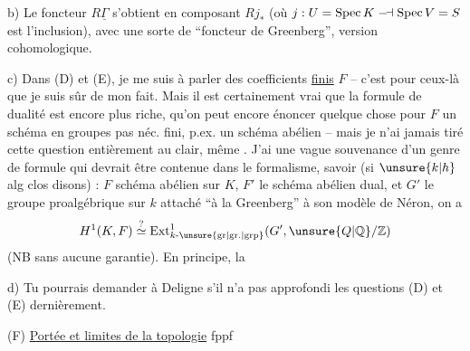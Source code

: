 b) Le foncteur $R\underline{\Gamma}$ s'obtient en composant $Rj_*$ (où $j:U=\operatorname{Spec}K\mathrel{\relbar\joinrel\dashv}\operatorname{Spec}V=S$ est l'inclusion), avec une sorte de ``foncteur de Greenberg'', version cohomologique.

c) Dans (D) et (E), je me suis  à parler des coefficients \uline{finis} $F$ -- c'est pour ceux-là que je suis sûr de mon fait. Mais il est certainement vrai que la formule de dualité est encore plus riche, qu'on peut encore énoncer quelque chose  pour  $F$ un schéma en groupes pas néc. fini, p.ex. un schéma abélien  -- mais je n'ai jamais tiré cette question entièrement au clair, même . J'ai une vague souvenance d'un genre de formule
qui devrait être contenue dans le formalisme, savoir (si $\unsure{k|h}$ alg clos disons) :  $F$ schéma abélien sur $K$, $F'$ le schéma abélien dual, et $G'$ le groupe proalgébrique sur $k$ attaché ``à la Greenberg'' à son modèle de Néron, on a
\[
 H^1(K,F)\overset{?}{\simeq}\operatorname{Ext}^{1}_{k\text{-}\unsure{\mathrm{gr}|\mathrm{gr.}|\mathrm{grp}}}(G',\unsure{Q|\mathbb Q}/\mathbb Z)
\]
(NB sans aucune garantie). En principe, la
{\reversemarginpar{}}

d) Tu pourrais demander à Deligne s'il n'a pas approfondi les questions (D) et (E) dernièrement.


(F) \uline{Portée et limites de la topologie} fppf

